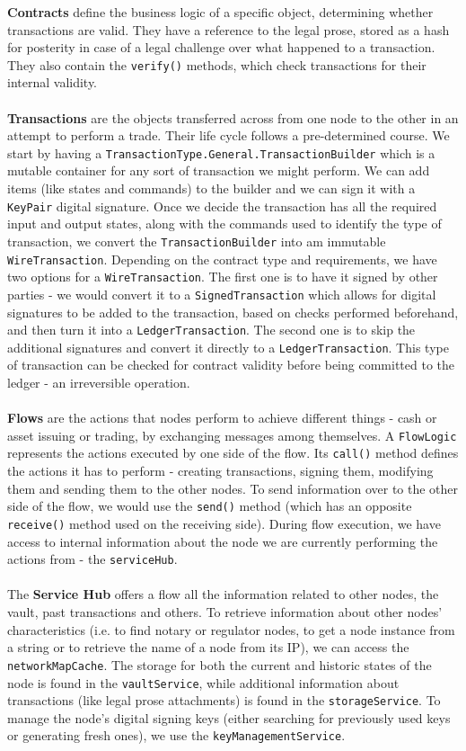 \documentclass[12pt,twoside]{article}
\begin{document}
\textbf{Contracts} define the business logic of a specific object, determining whether transactions are valid. They have a reference to the legal prose, stored as a hash for posterity in case of a legal challenge over what happened to a transaction. They also contain the \verb|verify()| methods, which check transactions for their internal validity.
\\ \\
\textbf{Transactions} are the objects transferred across from one node to the other in an attempt to perform a trade. Their life cycle follows a pre-determined course. We start by having a \verb|TransactionType.General.TransactionBuilder| which is a mutable container for any sort of transaction we might perform. We can add items (like states and commands) to the builder and we can sign it with a \verb|KeyPair| digital signature. Once we decide the transaction has all the required input and output states, along with the commands used to identify the type of transaction, we convert the \verb|TransactionBuilder| into am immutable \verb|WireTransaction|. Depending on the contract type and requirements, we have two options for a \verb|WireTransaction|. The first one is to have it signed by other parties - we would convert it to a \verb|SignedTransaction| which allows for digital signatures to be added to the transaction, based on checks performed beforehand, and then turn it into a \verb|LedgerTransaction|. The second one is to skip the additional signatures and convert it directly to a \verb|LedgerTransaction|. This type of transaction can be checked for contract validity before being committed to the ledger - an irreversible operation.
\\ \\
\textbf{Flows} are the actions that nodes perform to achieve different things - cash or asset issuing or trading, by exchanging messages among themselves. A \verb|FlowLogic| represents the actions executed by one side of the flow. Its \verb|call()| method defines the actions it has to perform - creating transactions, signing them, modifying them and sending them to the other nodes. To send information over to the other side of the flow, we would use the \verb|send()| method (which has an opposite \verb|receive()| method used on the receiving side). During flow execution, we have access to internal information about the node we are currently performing the actions from - the \verb|serviceHub|.
\\ \\
The \textbf{Service Hub} offers a flow all the information related to other nodes, the vault, past transactions and others. To retrieve information about other nodes' characteristics (i.e. to find notary or regulator nodes, to get a node instance from a string or to retrieve the name of a node from its IP), we can access the \verb|networkMapCache|. The storage for both the current and historic states of the node is found in the \verb|vaultService|, while additional information about transactions (like legal prose attachments) is found in the \verb|storageService|. To manage the node's digital signing keys (either searching for previously used keys or generating fresh ones), we use the \verb|keyManagementService|. 
\end{document}
